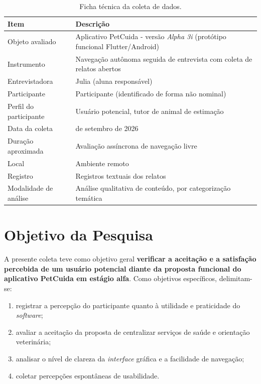 \documentclass[12pt,a4paper]{article}
\newcommand{\entrevistador}{Julia}
\newcommand{\participante}{Participante}
\begin{document}
\begin{table}[h!]
\centering
\begin{tabular}{@{}>{\raggedright\arraybackslash}p{4.8cm}>{\raggedright\arraybackslash}p{8.9cm}@{}}
\toprule
\textbf{Item} & \textbf{Descrição} \\
\midrule
Objeto avaliado & Aplicativo PetCuida - versão \textit{Alpha 3i} (protótipo funcional Flutter/Android) \\
Instrumento & Navegação autônoma seguida de entrevista com coleta de relatos abertos \\
Entrevistadora & \entrevistador{} (aluna responsável) \\
Participante & \participante{} (identificado de forma não nominal) \\
Perfil do participante & Usuário potencial, tutor de animal de estimação \\
Data da coleta & 16 de setembro de 2026 \\
Duração aproximada & Avaliação assíncrona de navegação livre \\
Local & Ambiente remoto \\
Registro & Registros textuais dos relatos \\
Modalidade de análise & Análise qualitativa de conteúdo, por categorização temática \\
\bottomrule
\end{tabular}
\caption{Ficha técnica da coleta de dados.}
\end{table}

\section{Objetivo da Pesquisa}

A presente coleta teve como objetivo geral \textbf{verificar a aceitação e a satisfação percebida de um usuário potencial diante da proposta funcional do aplicativo PetCuida em estágio alfa}. Como objetivos específicos, delimitam-se:

\begin{enumerate}[label=\alph*)]
  \item registrar a percepção do participante quanto à utilidade e praticidade do \textit{software};
  \item avaliar a aceitação da proposta de centralizar serviços de saúde e orientação veterinária;
  \item analisar o nível de clareza da \textit{interface} gráfica e a facilidade de navegação;
  \item coletar percepções espontâneas de usabilidade.
\end{enumerate}
\end{document}
